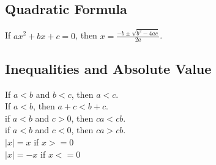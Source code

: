 \documentclass{article}
\begin{document}
	\subsection*{Quadratic Formula}
		\begin{center}
		If $ax^2 + bx +c = 0$, then $x = \frac{-b \pm \sqrt{b^2 - 4ac}}{2a}$.
		\end{center}
	\subsection*{Inequalities and Absolute Value}
		\begin{center}
		If $a < b$ and $b < c$, then $a < c$.\\
		If $a < b$, then $a + c < b + c$.\\
		if $a < b$ and $c > 0$, then $ca < cb$.\\
		if $a < b$ and $c < 0$, then $ca > cb$.\\
		$\left|x\right| = x$ if $x >= 0$\\
		$\left|x\right| = -x$ if $x <= 0$
		\end{center}
		
\end{document}
